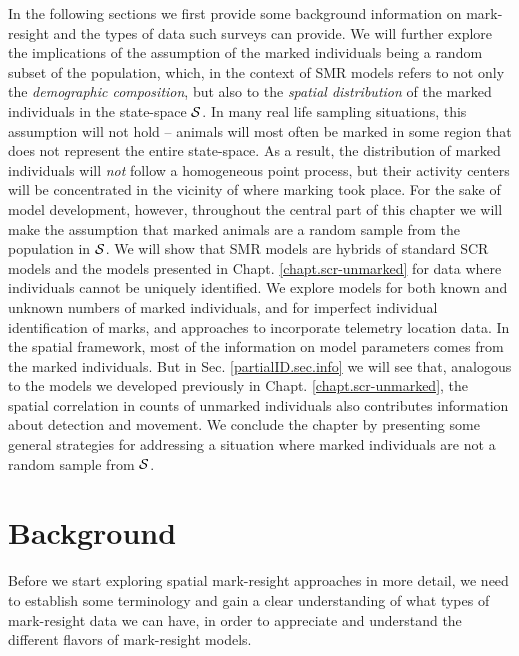 In the following sections we first provide some background
information on mark-resight and the types of data such surveys can
provide. We will further explore the implications of the assumption of
the marked individuals being a random subset of the population, which,
in the context of SMR models refers to not only the \emph{demographic
  composition}, but also to the \emph{spatial distribution} of the
marked individuals in the state-space ${\cal S}$.
In many real life sampling situations, this assumption will not hold
-- animals will most often be marked in some region that does not
represent the entire state-space. As a result, the distribution of
marked individuals will \emph{not} follow a homogeneous point process,
but their activity centers will be concentrated in the vicinity of
where marking took place. %
For the sake of model development, however, throughout the central part of this chapter we will make the assumption that marked animals are a random sample from the population in ${\cal S}$. We will show that SMR models are hybrids of standard SCR models and the models
presented in Chapt. \ref{chapt.scr-unmarked} for data where
individuals cannot be uniquely identified. We explore models for both
known and unknown numbers of marked individuals, and for imperfect
individual identification of marks, and approaches to incorporate
telemetry location data. In the spatial framework, most of the
information on model parameters comes from the marked individuals. But
in Sec. \ref{partialID.sec.info} we will see that, analogous to the
models we developed previously in Chapt. \ref{chapt.scr-unmarked}, the
spatial correlation in counts of unmarked individuals also contributes
information about detection and movement.
We conclude the chapter by presenting some general strategies for addressing a situation where marked individuals are not a random sample from ${\cal S}$.


\section{Background}

Before we start exploring spatial mark-resight approaches in more
detail, we need to establish some terminology and gain a clear
understanding of what types of mark-resight data we can have, in order
to appreciate and understand the different flavors of mark-resight
models.

